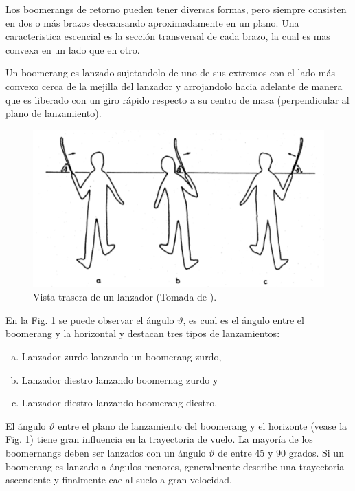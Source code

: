 	Los boomerangs de retorno pueden tener diversas formas, pero siempre consisten en dos o más brazos descansando aproximadamente en un plano. Una caracteristica escencial es la sección transversal de cada brazo, la cual es mas convexa en un lado que en otro.

	Un boomerang es lanzado sujetandolo de uno de sus extremos con el lado más convexo cerca  de la mejilla del lanzador y arrojandolo hacia adelante de manera que es liberado con un giro rápido respecto a su centro de masa (perpendicular al plano de lanzamiento).

			\begin{figure}[ht]
			\begin{center}
			\includegraphics[scale=0.5]{imagenes/3-boomerang/Lanzamiento.png}
			\caption{Vista trasera de un lanzador (Tomada de \cite{Hess1975}).}
			\label{fig1}
			\end{center}
			\end{figure}

	En la Fig. \ref{fig1} se puede observar el ángulo $\vartheta$, es cual es el ángulo entre el boomerang y la horizontal y destacan tres tipos de lanzamientos:

		\begin{enumerate}[a)]
		\item Lanzador zurdo lanzando un boomerang zurdo,
		\item Lanzador diestro lanzando boomernag zurdo y
		\item Lanzador diestro lanzando boomerang diestro.
    	\end{enumerate}

	El ángulo $\vartheta$  entre el plano de lanzamiento del boomerang y el horizonte (vease la Fig. \ref{fig1}) tiene gran influencia en la trayectoria de vuelo. La mayoría de los boomernangs deben ser lanzados con un ángulo $\vartheta$  de entre 45 y 90 grados. Si un boomerang es lanzado a ángulos menores, generalmente describe una trayectoria ascendente y finalmente cae al suelo a gran velocidad.

